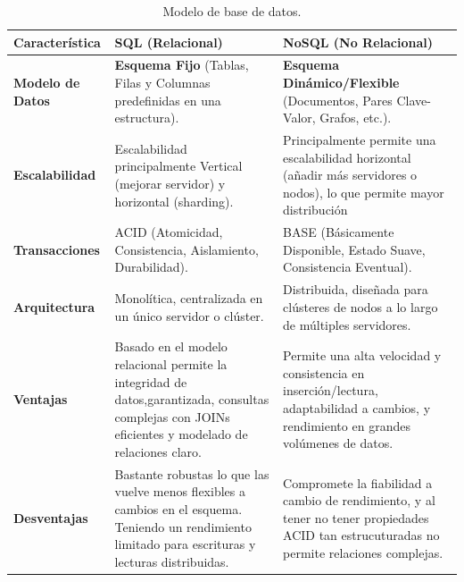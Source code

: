 \begingroup
\setlength{\tabcolsep}{6pt} %
\renewcommand{\arraystretch}{1.5} %

\begin{longtable}{|p{3.5cm}|p{5.5cm}|p{5.5cm}|}
\caption{Modelo de base de datos.}
\label{tab:modelodb} \\
\hline
\textbf{Característica} & \textbf{SQL (Relacional)}\cite{Oppel2011} & \textbf{NoSQL (No Relacional)}\cite{Gomez} \\
\hline
\textbf{Modelo de Datos} & \textbf{Esquema Fijo} (Tablas, Filas y Columnas predefinidas en una estructura). & \textbf{Esquema Dinámico/Flexible} (Documentos, Pares Clave-Valor, Grafos, etc.). \\
\hline
\textbf{Escalabilidad} & Escalabilidad  principalmente Vertical (mejorar servidor) y horizontal (sharding). & Principalmente permite una escalabilidad horizontal (añadir más servidores o nodos), lo que permite mayor distribución \\
\hline
\textbf{Transacciones } & ACID (Atomicidad, Consistencia, Aislamiento, Durabilidad). & BASE (Básicamente Disponible, Estado Suave, Consistencia Eventual). \\
\hline
\textbf{Arquitectura} & Monolítica, centralizada en un único servidor o clúster. & Distribuida, diseñada para clústeres de nodos a lo largo de múltiples servidores. \\
\hline
\textbf{Ventajas} & Basado en el modelo relacional permite la integridad de datos,garantizada, consultas complejas con JOINs eficientes y modelado de relaciones claro. & Permite una alta velocidad y consistencia en inserción/lectura, adaptabilidad a cambios, y rendimiento en grandes volúmenes de datos. \\
\hline
\textbf{Desventajas} & Bastante robustas lo que las vuelve menos flexibles a cambios en el esquema. Teniendo un rendimiento limitado para escrituras y lecturas distribuidas. & Compromete la fiabilidad a cambio de rendimiento, y al tener no tener propiedades ACID tan estrucuturadas no permite relaciones complejas. \\
\hline
\end{longtable}
\endgroup


